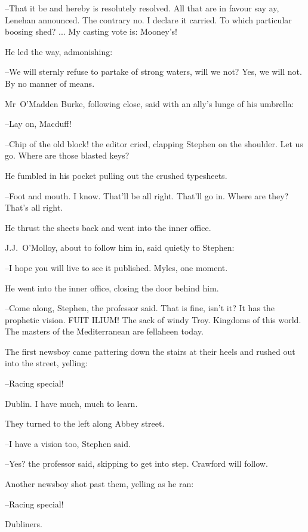 --That it be and hereby is resolutely resolved.
All that are in favour
say ay,
Lenehan announced.
The contrary no.
I declare it carried.
To which particular boosing shed? ...
My casting vote is:
Mooney's!

He led the way,
admonishing:

--We will sternly refuse to partake of strong waters,
will we not?
Yes, we will not.
By no manner of means.

Mr~O'Madden Burke,
following close,
said with an ally's lunge of his umbrella:

--Lay on, Macduff!

--Chip of the old block!
the editor cried,
clapping Stephen on the shoulder.
Let us go.
Where are those blasted keys?

He fumbled in his pocket
pulling out the crushed typesheets.

--Foot and mouth.
I know.
That'll be all right.
That'll go in.
Where are they?
That's all right.

He thrust the sheets back
and went into the inner office.



J.J.~O'Molloy,
about to follow him in,
said quietly to Stephen:

--I hope you will live to see it published.
Myles, one moment.

He went into the inner office,
closing the door behind him.

--Come along, Stephen,
the professor said.
That is fine, isn't it?
It has the prophetic vision.
FUIT ILIUM!
The sack of windy Troy.
Kingdoms of this world.
The masters of the Mediterranean are fellaheen today.

The first newsboy came pattering down the stairs at their heels
and rushed out into the street,
yelling:

--Racing special!

Dublin.
I have much, much to learn.

They turned to the left along Abbey street.

--I have a vision too,
Stephen said.

--Yes?
the professor said,
skipping to get into step.
Crawford will follow.

Another newsboy shot past them,
yelling as he ran:

--Racing special!



Dubliners.

